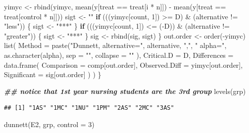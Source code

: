 \documentclass[
]{book}
\newenvironment{Shaded}{\begin{snugshade}}{\end{snugshade}}
\newcommand{\AttributeTok}[1]{\textcolor[rgb]{0.77,0.63,0.00}{#1}}
\newcommand{\ControlFlowTok}[1]{\textcolor[rgb]{0.13,0.29,0.53}{\textbf{#1}}}
\newcommand{\DecValTok}[1]{\textcolor[rgb]{0.00,0.00,0.81}{#1}}
\newcommand{\DocumentationTok}[1]{\textcolor[rgb]{0.56,0.35,0.01}{\textbf{\textit{#1}}}}
\newcommand{\FunctionTok}[1]{\textcolor[rgb]{0.00,0.00,0.00}{#1}}
\newcommand{\NormalTok}[1]{#1}
\newcommand{\OtherTok}[1]{\textcolor[rgb]{0.56,0.35,0.01}{#1}}
\newcommand{\SpecialCharTok}[1]{\textcolor[rgb]{0.00,0.00,0.00}{#1}}
\newcommand{\StringTok}[1]{\textcolor[rgb]{0.31,0.60,0.02}{#1}}
\begin{document}
\begin{Shaded}
\begin{Highlighting}[]
\NormalTok{    yimyc }\OtherTok{\textless{}{-}} \FunctionTok{rbind}\NormalTok{(yimyc, }\FunctionTok{mean}\NormalTok{(y[treat }\SpecialCharTok{==}\NormalTok{ treat[i }\SpecialCharTok{*}\NormalTok{ n]]) }\SpecialCharTok{{-}}
      \FunctionTok{mean}\NormalTok{(y[treat }\SpecialCharTok{==}\NormalTok{ treat[control }\SpecialCharTok{*}\NormalTok{ n]]))}
\NormalTok{    sigt }\OtherTok{\textless{}{-}} \StringTok{""}
    \ControlFlowTok{if}\NormalTok{ (((yimyc[count, }\DecValTok{1}\NormalTok{]) }\SpecialCharTok{\textgreater{}=}\NormalTok{ D) }\SpecialCharTok{\&}\NormalTok{ (alternative }\SpecialCharTok{!=} \StringTok{"less"}\NormalTok{)) \{}
\NormalTok{      sigt }\OtherTok{\textless{}{-}} \StringTok{"***"}
\NormalTok{    \}}
    \ControlFlowTok{if}\NormalTok{ (((yimyc[count, }\DecValTok{1}\NormalTok{]) }\SpecialCharTok{\textless{}=}\NormalTok{ (}\SpecialCharTok{{-}}\NormalTok{D)) }\SpecialCharTok{\&}\NormalTok{ (alternative }\SpecialCharTok{!=} \StringTok{"greater"}\NormalTok{)) \{}
\NormalTok{      sigt }\OtherTok{\textless{}{-}} \StringTok{"***"}
\NormalTok{    \}}
\NormalTok{    sig }\OtherTok{\textless{}{-}} \FunctionTok{rbind}\NormalTok{(sig, sigt)}
\NormalTok{  \}}
\NormalTok{  out.order }\OtherTok{\textless{}{-}} \FunctionTok{order}\NormalTok{(}\SpecialCharTok{{-}}\NormalTok{yimyc)}
  \FunctionTok{list}\NormalTok{(}
    \AttributeTok{Method =} \FunctionTok{paste}\NormalTok{(}\StringTok{"Dunnett, alternative="}\NormalTok{, alternative, }\StringTok{","}\NormalTok{, }\StringTok{" alpha="}\NormalTok{,}
      \FunctionTok{as.character}\NormalTok{(alpha),}
      \AttributeTok{sep =} \StringTok{""}\NormalTok{, }\AttributeTok{collapse =} \StringTok{""}
\NormalTok{    ),}
    \AttributeTok{Critical.D =}\NormalTok{ D, }\AttributeTok{Differences =} \FunctionTok{data.frame}\NormalTok{(}
      \AttributeTok{Comparison =}\NormalTok{ comp[out.order],}
      \AttributeTok{Observed.Diff =}\NormalTok{ yimyc[out.order], }\AttributeTok{Significant =}\NormalTok{ sig[out.order]}
\NormalTok{    )}
\NormalTok{  )}
\NormalTok{\}}

\DocumentationTok{\#\# notice that 1st year nursing students are the 3rd group}
\FunctionTok{levels}\NormalTok{(grp)}
\end{Highlighting}
\end{Shaded}

\begin{verbatim}
## [1] "1AS" "1MC" "1NU" "1PM" "2AS" "2MC" "3AS"
\end{verbatim}

\begin{Shaded}
\begin{Highlighting}[]
\FunctionTok{dunnett}\NormalTok{(E2, grp, }\AttributeTok{control =} \DecValTok{3}\NormalTok{)}
\end{Highlighting}
\end{Shaded}
\end{document}
